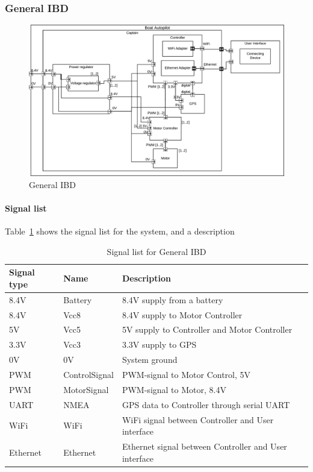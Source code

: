 \subsubsection{General IBD}
\begin{figure}[H]
	\centering
	\includegraphics[width=1\linewidth]{Images/System_architecture/General_IBD}
	\caption{General IBD}
	\label{fig:general_ibd}
\end{figure}

\paragraph{Signal list}

Table~\ref{table:general_ibd} shows the signal list for the system, and a description
\begin{table}[htbp]
	\centering
	\begin{tabular}{|l|l|l|}
		\hline
		\textbf{Signal type} 	&\textbf{Name}		&\textbf{Description} \\\hline
		8.4V			&Battery	&8.4V supply from a battery\\\hline
		
		8.4V			&Vcc8		&8.4V supply to Motor Controller\\\hline
		5V			&Vcc5		&5V supply to Controller and Motor Controller\\\hline
		3.3V			&Vcc3		&3.3V supply to GPS\\\hline
		0V			&0V			&System ground\\\hline
		PWM	&ControlSignal	&PWM-signal to Motor Control, 5V\\\hline
		PWM	&MotorSignal	&PWM-signal to Motor, 8.4V\\\hline
		UART		&NMEA		&GPS data to Controller through serial UART\\\hline	
		WiFi		&WiFi		&WiFi signal between Controller and User interface\\\hline
		Ethernet	&Ethernet	&Ethernet signal between Controller and User interface\\\hline
		
		
	\end{tabular}
	\caption{Signal list for General IBD}
	\label{table:general_ibd}
\end{table}

